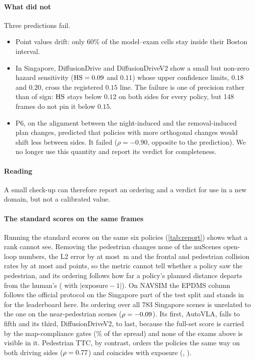 \paragraph{What did not}
Three predictions fail.
\begin{itemize}
\item Point values drift: only 60\% of the model--exam cells stay inside their Boston interval.
\item In Singapore, DiffusionDrive and DiffusionDriveV2 show a small but non-zero hazard sensitivity ($\mathrm{HS}=0.09$ and $0.11$) whose upper confidence limits, $0.18$ and $0.20$, cross the registered $0.15$ line. The failure is one of precision rather than of sign: $\mathrm{HS}$ stays below $0.12$ on both sides for every policy, but 148 frames do not pin it below $0.15$.
\item P6, on the alignment between the night-induced and the removal-induced plan changes, predicted that policies with more orthogonal changes would shift less between sides. It failed ($\rho=-0.90$, opposite to the prediction). We no longer use this quantity and report its verdict for completeness.
\end{itemize}

\paragraph{Reading}
A small check-up can therefore report an ordering and a verdict for use in a new domain, but not a
calibrated value.

\paragraph{The standard scores on the same frames}
Running the standard scores on the same six policies (\cref{tab:report}) shows what a rank cannot see.
Removing the pedestrian changes none of the nuScenes open-loop numbers, the L2 error by at most \NumMaxdLtwo\,m and the frontal and pedestrian collision rates by at most \NumMaxdCol{} and \NumMaxdPed{} points, so the metric cannot tell
whether a policy saw the pedestrian, and its ordering follows how far a policy's planned distance
departs from the human's (\NumRhoLtwoExp{} with $|\text{exposure}-1|$). On NAVSIM the EPDMS column follows the official protocol on the Singapore part of the test split and stands in for the leaderboard here. Its ordering over all 783 Singapore scenes is unrelated to the one on the \NumNclose{} near-pedestrian scenes ($\rho=-0.09$). Its first, AutoVLA, falls to fifth and its third, DiffusionDriveV2, to
last, because the full-set score is carried by the map-compliance gates (\NumMapShare\% of the spread)
and none of the exams above is visible in it. Pedestrian TTC, by contrast, orders the policies the
same way on both driving sides ($\rho=0.77$) and coincides with exposure (\NumRhoTTCExpL{},
\NumRhoTTCExpR).

